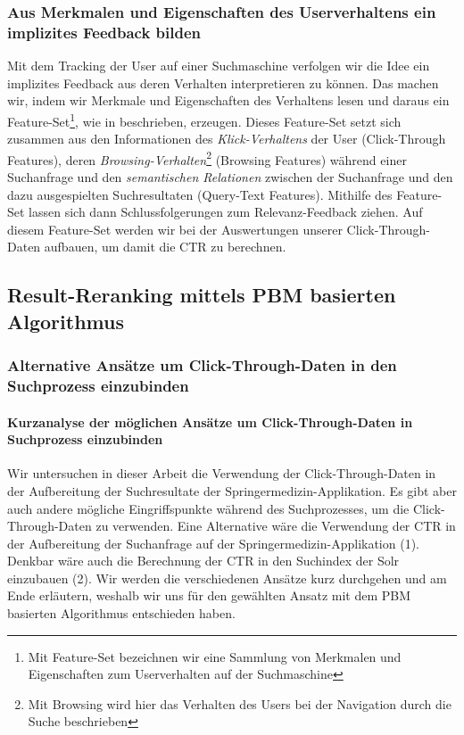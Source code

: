 \subsubsection{Aus Merkmalen und Eigenschaften des Userverhaltens ein implizites Feedback bilden}
\label{sec:Grundlagen:Grundbegriffe:Click-Through-Daten:UserverhaltensFeedback}

Mit dem Tracking der User auf einer Suchmaschine verfolgen wir die Idee ein implizites Feedback aus deren Verhalten interpretieren zu können. Das machen wir, indem wir Merkmale und Eigenschaften des Verhaltens lesen und daraus ein Feature-Set\footnote{Mit Feature-Set bezeichnen wir eine Sammlung von Merkmalen und Eigenschaften zum Userverhalten auf der Suchmaschine}, wie in \cite{IWUSBI} beschrieben, erzeugen. Dieses Feature-Set setzt sich zusammen aus den Informationen des \textit{Klick-Verhaltens} der User (Click-Through Features), deren \textit{Browsing-Verhalten}\footnote{Mit Browsing wird hier das Verhalten des Users bei der Navigation durch die Suche beschrieben} (Browsing Features) während einer Suchanfrage und den \textit{semantischen Relationen} zwischen der Suchanfrage und den dazu ausgespielten Suchresultaten (Query-Text Features). Mithilfe des Feature-Set lassen sich dann  Schlussfolgerungen zum Relevanz-Feedback ziehen. Auf diesem Feature-Set werden wir bei der Auswertungen unserer Click-Through-Daten aufbauen, um damit die CTR zu berechnen.


\subsection{Result-Reranking mittels PBM basierten Algorithmus}
\label{sec:Grundlagen:Grundbegriffe:Result-RerankingPBM}

\subsubsection{Alternative Ansätze um Click-Through-Daten in den Suchprozess einzubinden}
\label{sec:Grundlagen:Grundbegriffe:Result-RerankingPBM:AlternativenSucheEinbinden}

\paragraph{Kurzanalyse der möglichen Ansätze um Click-Through-Daten in Suchprozess einzubinden} 
Wir untersuchen in dieser Arbeit die Verwendung der Click-Through-Daten in der Aufbereitung der Suchresultate der Springermedizin-Applikation. Es gibt aber auch andere mögliche Eingriffspunkte während des Suchprozesses, um die Click-Through-Daten zu verwenden. Eine Alternative wäre die Verwendung der CTR in der Aufbereitung der Suchanfrage auf der Springermedizin-Applikation (1). Denkbar wäre auch die Berechnung der CTR in den Suchindex der Solr einzubauen (2). Wir werden die verschiedenen Ansätze kurz durchgehen und am Ende erläutern, weshalb wir uns für den gewählten Ansatz mit dem PBM basierten Algorithmus entschieden haben.

